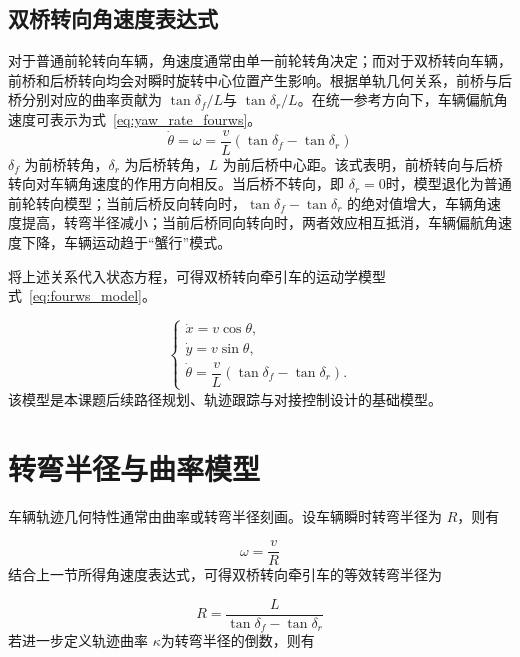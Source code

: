 \subsection{双桥转向角速度表达式}

对于普通前轮转向车辆，角速度通常由单一前轮转角决定；而对于双桥转向车辆，前桥和后桥转向均会对瞬时旋转中心位置产生影响。根据单轨几何关系，前桥与后桥分别对应的曲率贡献为
\(\tan\delta_{f}/L\)与
\(\tan\delta_{r}/L\)。在统一参考方向下，车辆偏航角速度可表示为式~\ref{eq:yaw_rate_fourws}。
\begin{equation}
\dot{\theta} = \omega = \frac{v}{L}\left( \tan\delta_{f} - \tan\delta_{r} \right)
\label{eq:yaw_rate_fourws}
\end{equation}
\(\delta_{f}\)
为前桥转角，\(\delta_{r}\) 为后桥转角，\(L\)
为前后桥中心距。该式表明，前桥转向与后桥转向对车辆角速度的作用方向相反。当后桥不转向，即
\(\delta_{r} = 0\)时，模型退化为普通前轮转向模型；当前后桥反向转向时，\(\tan\delta_{f} - \tan\delta_{r}\)
的绝对值增大，车辆角速度提高，转弯半径减小；当前后桥同向转向时，两者效应相互抵消，车辆偏航角速度下降，车辆运动趋于``蟹行''模式。

将上述关系代入状态方程，可得双桥转向牵引车的运动学模型式~\ref{eq:fourws_model}。

\begin{equation}
\begin{cases}
\dot{x}=v\cos\theta,\\
\dot{y}=v\sin\theta,\\
\dot{\theta}=\dfrac{v}{L}\left(\tan\delta_{f}-\tan\delta_{r}\right).
\end{cases}
\label{eq:fourws_model}
\end{equation}
该模型是本课题后续路径规划、轨迹跟踪与对接控制设计的基础模型\cite{ref17,ref19,ref28}。

\section{转弯半径与曲率模型}

车辆轨迹几何特性通常由曲率或转弯半径刻画。设车辆瞬时转弯半径为
\(R\)，则有

\begin{equation}
\omega = \frac{v}{R}
\label{eq:3}
\end{equation}
结合上一节所得角速度表达式，可得双桥转向牵引车的等效转弯半径为

\begin{equation}
R = \frac{L}{\tan\delta_{f} - \tan\delta_{r}}
\label{eq:4}
\end{equation}
若进一步定义轨迹曲率 \(\kappa\)为转弯半径的倒数，则有

